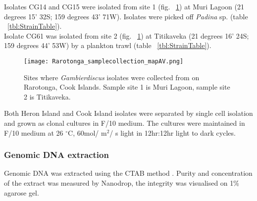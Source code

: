 \documentclass[12pt]{article}
\begin{document}
Isolates CG14 and CG15 were isolated from site 1 (fig. ~\ref{fig:RaroSam}) at Muri Lagoon (21 degrees 15' 32S; 159 degrees 43' 71W). Isolates were picked off \emph{Padina} sp. (table ~\ref{tbl:StrainTable}).\\
Isolate CG61 was isolated from site 2 (fig. ~\ref{fig:RaroSam}) at Titikaveka (21 degrees 16' 24S; 159 degrees 44' 53W) by a plankton trawl (table ~\ref{tbl:StrainTable}).
 
\begin{figure} 
\texttt{[image: Rarotonga\_samplecollection\_mapAV.png]} 
\caption{Sites where \emph{Gambierdiscus} isolates were collected from on Rarotonga, Cook Islands. Sample site 1 is Muri Lagoon, sample site 2 is Titikaveka.} 
\label{fig:RaroSam}
\end{figure} 
\FloatBarrier 


Both Heron Island and Cook Island isolates were separated by single cell isolation and grown as clonal cultures in F/10 medium. The cultures were maintained in F/10 medium at 26 $^{\circ}$C, 60mol/ m$^{2}$/ s light in 12hr:12hr light to dark cycles.

\subsubsection{Genomic DNA extraction}
Genomic DNA was extracted using the CTAB method \cite{zhou1999analysis}. Purity and concentration of the extract was measured by Nanodrop, the integrity was visualised on 1\% agarose gel.
\end{document}
